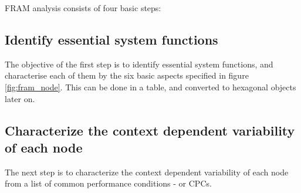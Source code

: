FRAM analysis consists of four basic steps:

\subsection{Identify essential system functions}
The objective of the first step is to identify essential system functions, and characterise each of them by the six basic aspects specified in figure \ref{fig:fram_node}. This can be done in a table, and converted to hexagonal objects later on.
\subsection{Characterize the context dependent variability of each node}
The next step is to characterize the context dependent variability of each node from a list of common performance conditions - or CPCs. 



